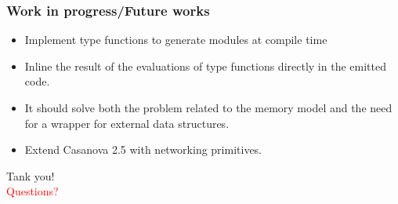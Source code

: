 \documentclass[10pt,a4paper]{beamer}
\begin{document}
\begin{frame}
	\frametitle{Work in progress/Future works}
	\begin{itemize}
		\item Implement type functions to generate modules at compile time
		\item Inline the result of the evaluations of type functions directly in the emitted code.
		\item It should solve both the problem related to the memory model and the need for a wrapper for external data structures.
		\item Extend Casanova 2.5 with networking primitives.
	\end{itemize}
\end{frame}

\begin{frame}
	\centering
	\Huge
	Tank you!\\
	\vspace{0.5cm}
	\textcolor{red}{Questions?}
\end{frame}
\end{document}
